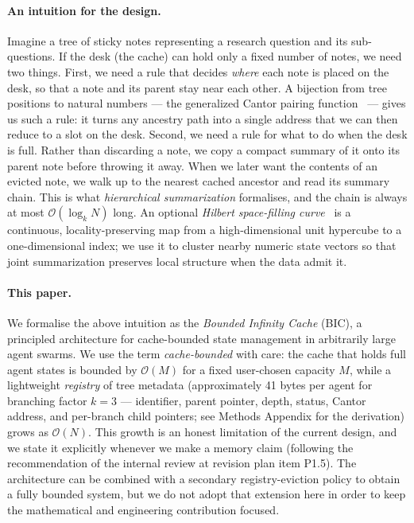 \documentclass[fleqn,10pt]{article}
\theoremstyle{definition}
\newcommand{\Oh}{\mathcal{O}}
\begin{document}
\paragraph{An intuition for the design.}
Imagine a tree of sticky notes representing a research question and
its sub-questions. If the desk (the cache) can hold only a fixed
number of notes, we need two things. First, we need a rule that
decides \emph{where} each note is placed on the desk, so that a note
and its parent stay near each other. A bijection from tree positions
to natural numbers --- the generalized Cantor pairing
function~\citep{cantor1878beitrag} --- gives us such a rule: it turns
any ancestry path into a single address that we can then reduce to a
slot on the desk. Second, we need a rule for what to do when the desk
is full. Rather than discarding a note, we copy a compact summary of
it onto its parent note before throwing it away. When we later want
the contents of an evicted note, we walk up to the nearest cached
ancestor and read its summary chain. This is what \emph{hierarchical
summarization} formalises, and the chain is always at most
$\Oh(\log_k N)$ long. An optional \emph{Hilbert space-filling
curve}~\citep{skilling2004hilbert, moon2001hilbert} is a continuous,
locality-preserving map from a high-dimensional unit hypercube to a
one-dimensional index; we use it to cluster nearby numeric state
vectors so that joint summarization preserves local structure when
the data admit it.

\paragraph{This paper.}
We formalise the above intuition as the \emph{Bounded Infinity Cache}
(BIC), a principled architecture for cache-bounded state management
in arbitrarily large agent swarms. We use the term
\emph{cache-bounded} with care: the cache that holds full agent states
is bounded by $\Oh(M)$ for a fixed user-chosen capacity $M$, while
a lightweight \emph{registry} of tree metadata
(approximately 41 bytes per agent for branching factor $k{=}3$ ---
identifier, parent pointer, depth, status, Cantor address, and
per-branch child pointers; see Methods Appendix for the derivation)
grows as $\Oh(N)$. This growth is an
honest limitation of the current design, and we state it explicitly
whenever we make a memory claim (following the recommendation of the
internal review at revision plan item P1.5). The architecture can
be combined with a secondary registry-eviction policy to obtain a
fully bounded system, but we do not adopt that extension here in
order to keep the mathematical and engineering contribution focused.
\end{document}
